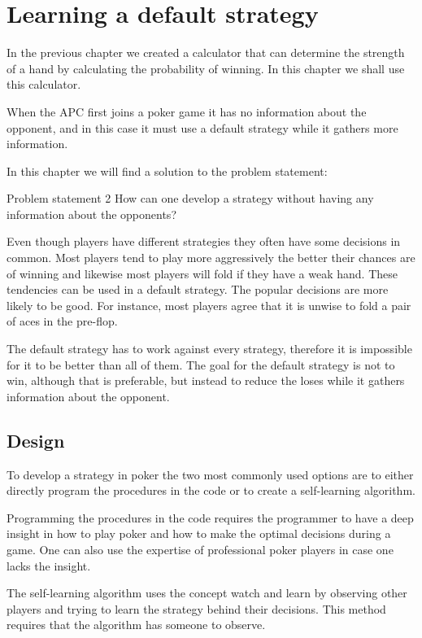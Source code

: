 \section{Learning a default strategy}
\label{sec:part2}
In the previous chapter we created a calculator that can determine the strength of a hand by calculating the probability of winning. In this chapter we shall use this calculator.

When the APC first joins a poker game it has no information about the opponent, and in this case it must use a default strategy while it gathers more information.

In this chapter we will find a solution to the problem statement:

\vspace{4mm}
\begin{statementBox2}{Problem statement 2}
How can one develop a strategy without having any information about the opponents?
\end{statementBox2}
\vspace{4mm}

Even though players have different strategies they often have some decisions in common. Most players tend to play more aggressively the better their chances are of winning and likewise most players will fold if they have a weak hand. These tendencies can be used in a default strategy. The popular decisions are more likely to be good. For instance, most players agree that it is unwise to fold a pair of aces in the pre-flop. 

The default strategy has to work against every strategy, therefore it is impossible for it to be better than all of them. The goal for the default strategy is not to win, although that is preferable, but instead to reduce the loses while it gathers information about the opponent.

\subsection{Design}
To develop a strategy in poker the two most commonly used options are to either directly program the procedures in the code or to create a self-learning algorithm. 

Programming the procedures in the code requires the programmer to have a deep insight in how to play poker and how to make the optimal decisions during a game. One can also use the expertise of professional poker players in case one lacks the insight.

The self-learning algorithm uses the concept watch and learn by observing other players and trying to learn the strategy behind their decisions. This method requires that the algorithm has someone to observe.

